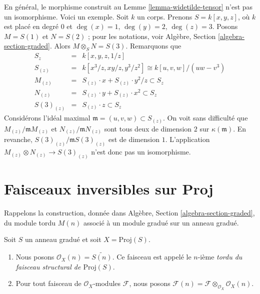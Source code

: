\begin{remark}
\label{remark-not-isomorphism}
En général, le morphisme construit au Lemme \ref{lemma-widetilde-tensor}
n'est pas un isomorphisme. Voici un exemple. Soit $k$ un corps. Prenons
$S = k[x, y, z]$, où $k$ est placé en degré $0$ et
$\deg(x) = 1$, $\deg(y) = 2$, $\deg(z) = 3$.
Posons $M = S(1)$ et $N = S(2)$ ; pour les notations, voir Algèbre,
Section \ref{algebra-section-graded}. Alors $M \otimes_S N = S(3)$.
Remarquons que
\begin{eqnarray*}
S_z
& = &
k[x, y, z, 1/z] \\
S_{(z)}
& = &
k[x^3/z, xy/z, y^3/z^2]
\cong
k[u, v, w]/(uw - v^3) \\
M_{(z)} & = & S_{(z)} \cdot x + S_{(z)} \cdot y^2/z \subset S_z \\
N_{(z)} & = & S_{(z)} \cdot y + S_{(z)} \cdot x^2 \subset S_z \\
S(3)_{(z)} & = & S_{(z)} \cdot z \subset S_z
\end{eqnarray*}
Considérons l'idéal maximal $\mathfrak m = (u, v, w) \subset S_{(z)}$.
On voit sans difficulté que $M_{(z)}/\mathfrak mM_{(z)}$ et
$N_{(z)}/\mathfrak mN_{(z)}$ sont tous deux de dimension $2$ sur
$\kappa(\mathfrak m)$. En revanche,
$S(3)_{(z)}/\mathfrak mS(3)_{(z)}$ est de dimension $1$.
L'application $M_{(z)} \otimes N_{(z)} \to S(3)_{(z)}$ n'est donc pas un
isomorphisme.
\end{remark}


\section{Faisceaux inversibles sur Proj}
\label{section-invertible-on-proj}

\noindent
Rappelons la construction, donnée dans Algèbre,
Section \ref{algebra-section-graded}, du module tordu $M(n)$ associé à un
module gradué sur un anneau gradué.

\begin{definition}
\label{definition-twist}
Soit $S$ un anneau gradué et soit $X = \text{Proj}(S)$.
\begin{enumerate}
\item Nous posons $\mathcal{O}_X(n) = \widetilde{S(n)}$. Ce faisceau est
appelé le $n$-ième {\it tordu du faisceau structural de $\text{Proj}(S)$}.
\item Pour tout faisceau de $\mathcal{O}_X$-modules $\mathcal{F}$, nous posons
$\mathcal{F}(n) = \mathcal{F} \otimes_{\mathcal{O}_X} \mathcal{O}_X(n)$.
\end{enumerate}
\end{definition}

